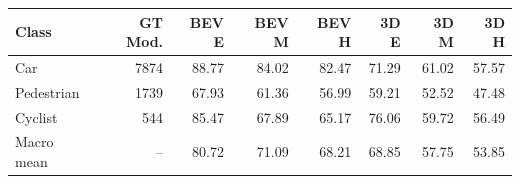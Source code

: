 \begin{tabular}{lrrrrrrr}
\toprule
Class & GT Mod. & BEV E & BEV M & BEV H & 3D E & 3D M & 3D H \\
\midrule
Car & 7874 & 88.77 & 84.02 & 82.47 & 71.29 & 61.02 & 57.57 \\
Pedestrian & 1739 & 67.93 & 61.36 & 56.99 & 59.21 & 52.52 & 47.48 \\
Cyclist & 544 & 85.47 & 67.89 & 65.17 & 76.06 & 59.72 & 56.49 \\
Macro mean & -- & 80.72 & 71.09 & 68.21 & 68.85 & 57.75 & 53.85 \\
\bottomrule
\end{tabular}
